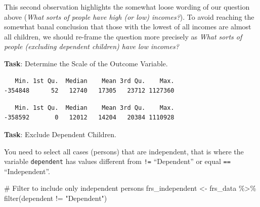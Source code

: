 \documentclass[
  letterpaper,
  DIV=11,
  numbers=noendperiod]{scrreprt}
\newenvironment{Shaded}{\begin{snugshade}}{\end{snugshade}}
\newcommand{\CommentTok}[1]{\textcolor[rgb]{0.37,0.37,0.37}{#1}}
\newcommand{\FunctionTok}[1]{\textcolor[rgb]{0.28,0.35,0.67}{#1}}
\newcommand{\NormalTok}[1]{\textcolor[rgb]{0.00,0.23,0.31}{#1}}
\newcommand{\OtherTok}[1]{\textcolor[rgb]{0.00,0.23,0.31}{#1}}
\newcommand{\SpecialCharTok}[1]{\textcolor[rgb]{0.37,0.37,0.37}{#1}}
\newcommand{\StringTok}[1]{\textcolor[rgb]{0.13,0.47,0.30}{#1}}
\begin{document}
This second observation highlights the somewhat loose wording of our
question above (\emph{What sorts of people have high (or low)
incomes?}). To avoid reaching the somewhat banal conclusion that those
with the lowest of all incomes are almost all children, we should
re-frame the question more precisely as \emph{What sorts of people
(excluding dependent children) have low incomes?}

\textbf{Task}: Determine the Scale of the Outcome Variable.

\begin{Shaded}
\end{Shaded}

\begin{verbatim}
   Min. 1st Qu.  Median    Mean 3rd Qu.    Max. 
-354848      52   12740   17305   23712 1127360 
\end{verbatim}

\begin{Shaded}
\end{Shaded}

\begin{verbatim}
   Min. 1st Qu.  Median    Mean 3rd Qu.    Max. 
-358592       0   12012   14204   20384 1110928 
\end{verbatim}

\textbf{Task}: Exclude Dependent Children.

You need to select all cases (persons) that are independent, that is
where the variable \texttt{dependent} has values different from
\texttt{!=} ``Dependent'' or equal \texttt{==} ``Independent''.

\begin{Shaded}
\begin{Highlighting}[]
\CommentTok{\# Filter to include only independent persons}
\NormalTok{frs\_independent }\OtherTok{\textless{}{-}}\NormalTok{ frs\_data }\SpecialCharTok{\%\textgreater{}\%} \FunctionTok{filter}\NormalTok{(dependent }\SpecialCharTok{!=} \StringTok{"Dependent"}\NormalTok{)}
\end{Highlighting}
\end{Shaded}
\end{document}
